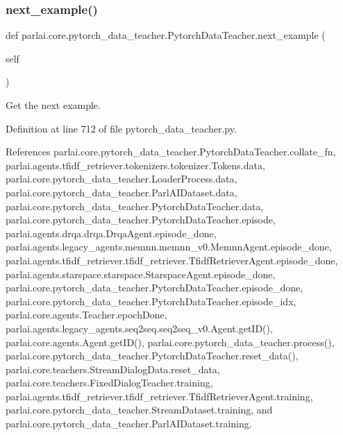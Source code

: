 \subsubsection{\texorpdfstring{next\+\_\+example()}{next\_example()}}
{\footnotesize\ttfamily def parlai.\+core.\+pytorch\+\_\+data\+\_\+teacher.\+Pytorch\+Data\+Teacher.\+next\+\_\+example (\begin{DoxyParamCaption}\item[{}]{self }\end{DoxyParamCaption})}

\begin{DoxyVerb}Get the next example.\end{DoxyVerb}
 

Definition at line 712 of file pytorch\+\_\+data\+\_\+teacher.\+py.



References parlai.\+core.\+pytorch\+\_\+data\+\_\+teacher.\+Pytorch\+Data\+Teacher.\+collate\+\_\+fn, parlai.\+agents.\+tfidf\+\_\+retriever.\+tokenizers.\+tokenizer.\+Tokens.\+data, parlai.\+core.\+pytorch\+\_\+data\+\_\+teacher.\+Loader\+Process.\+data, parlai.\+core.\+pytorch\+\_\+data\+\_\+teacher.\+Parl\+A\+I\+Dataset.\+data, parlai.\+core.\+pytorch\+\_\+data\+\_\+teacher.\+Pytorch\+Data\+Teacher.\+data, parlai.\+core.\+pytorch\+\_\+data\+\_\+teacher.\+Pytorch\+Data\+Teacher.\+episode, parlai.\+agents.\+drqa.\+drqa.\+Drqa\+Agent.\+episode\+\_\+done, parlai.\+agents.\+legacy\+\_\+agents.\+memnn.\+memnn\+\_\+v0.\+Memnn\+Agent.\+episode\+\_\+done, parlai.\+agents.\+tfidf\+\_\+retriever.\+tfidf\+\_\+retriever.\+Tfidf\+Retriever\+Agent.\+episode\+\_\+done, parlai.\+agents.\+starspace.\+starspace.\+Starspace\+Agent.\+episode\+\_\+done, parlai.\+core.\+pytorch\+\_\+data\+\_\+teacher.\+Pytorch\+Data\+Teacher.\+episode\+\_\+done, parlai.\+core.\+pytorch\+\_\+data\+\_\+teacher.\+Pytorch\+Data\+Teacher.\+episode\+\_\+idx, parlai.\+core.\+agents.\+Teacher.\+epoch\+Done, parlai.\+agents.\+legacy\+\_\+agents.\+seq2seq.\+seq2seq\+\_\+v0.\+Agent.\+get\+I\+D(), parlai.\+core.\+agents.\+Agent.\+get\+I\+D(), parlai.\+core.\+pytorch\+\_\+data\+\_\+teacher.\+process(), parlai.\+core.\+pytorch\+\_\+data\+\_\+teacher.\+Pytorch\+Data\+Teacher.\+reset\+\_\+data(), parlai.\+core.\+teachers.\+Stream\+Dialog\+Data.\+reset\+\_\+data, parlai.\+core.\+teachers.\+Fixed\+Dialog\+Teacher.\+training, parlai.\+agents.\+tfidf\+\_\+retriever.\+tfidf\+\_\+retriever.\+Tfidf\+Retriever\+Agent.\+training, parlai.\+core.\+pytorch\+\_\+data\+\_\+teacher.\+Stream\+Dataset.\+training, and parlai.\+core.\+pytorch\+\_\+data\+\_\+teacher.\+Parl\+A\+I\+Dataset.\+training.




